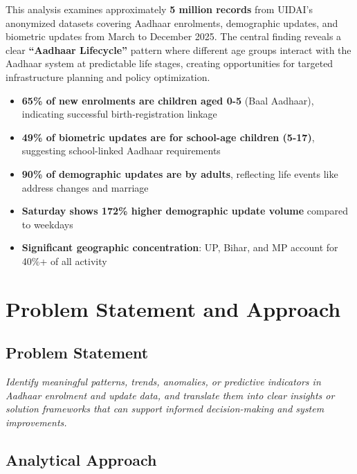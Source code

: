 \documentclass[11pt,a4paper]{article}
\newcommand{\highlight}[1]{\textbf{\textcolor{primaryblue}{#1}}}
\newcommand{\stat}[1]{\textbf{#1}}
\begin{document}
This analysis examines approximately \stat{5 million records} from UIDAI's anonymized datasets covering Aadhaar enrolments, demographic updates, and biometric updates from March to December 2025. The central finding reveals a clear \highlight{``Aadhaar Lifecycle''} pattern where different age groups interact with the Aadhaar system at predictable life stages, creating opportunities for targeted infrastructure planning and policy optimization.

\begin{insightbox}
\begin{itemize}[leftmargin=*]
    \item \textbf{65\% of new enrolments are children aged 0-5} (Baal Aadhaar), indicating successful birth-registration linkage
    \item \textbf{49\% of biometric updates are for school-age children (5-17)}, suggesting school-linked Aadhaar requirements
    \item \textbf{90\% of demographic updates are by adults}, reflecting life events like address changes and marriage
    \item \textbf{Saturday shows 172\% higher demographic update volume} compared to weekdays
    \item \textbf{Significant geographic concentration}: UP, Bihar, and MP account for 40\%+ of all activity
\end{itemize}
\end{insightbox}

\section{Problem Statement and Approach}

\subsection{Problem Statement}
\textit{Identify meaningful patterns, trends, anomalies, or predictive indicators in Aadhaar enrolment and update data, and translate them into clear insights or solution frameworks that can support informed decision-making and system improvements.}

\subsection{Analytical Approach}
\end{document}
